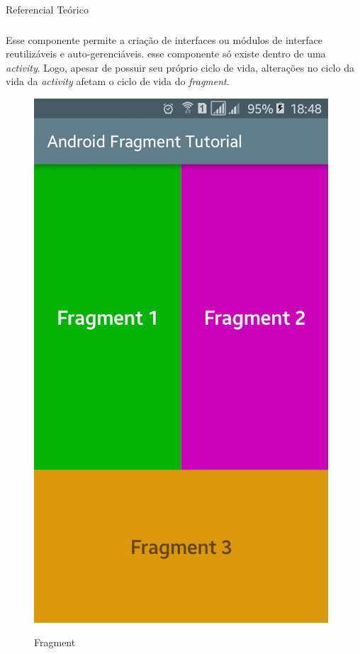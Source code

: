 \documentclass[
	12pt,				%
	openany,			%
	twoside,			%
	a4paper,			%
	english,			%
	french,				%
	spanish,			%
	brazil				%
	]{abntex2}
\begin{document}
\begin{chapter}{Referencial Teórico}
\subsubsection{} \label{fragment} 
Esse componente permite a criação de interfaces ou módulos de interface reutilizáveis e auto-gerenciáveis. esse componente só existe dentro de uma \textit{activity}. Logo, apesar de possuir seu próprio ciclo de vida, alterações no ciclo da vida da \textit{activity} afetam o ciclo de vida do \textit{fragment}.  

\begin{figure}[h]
\centering
   \caption{Fragment}
   \includegraphics[scale=0.4]{media/fragments.png}
     \label{fig:fragments_preview}
\end{figure}


\end{chapter}
\end{document}
